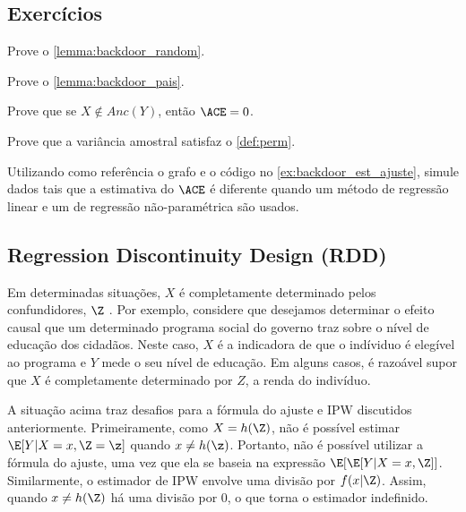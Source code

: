 \subsection{Exercícios}

\begin{exercise}
 Prove o \cref{lemma:backdoor_random}.
\end{exercise}

\begin{exercise}
 Prove o \cref{lemma:backdoor_pais}.
\end{exercise}

\begin{exercise}
 \label{ex:ace_sem_causa}
 Prove que se $X \notin Anc(Y)$, então $\ACE = 0$.
\end{exercise}

\begin{exercise}
 Prove que a variância amostral satisfaz
 o \cref{def:perm}.
\end{exercise}

\begin{exercise}
 Utilizando como referência o grafo e
 o código no \cref{ex:backdoor_est_ajuste},
 simule dados tais que a estimativa do $\ACE$ é
 diferente quando um método de regressão linear e
 um de regressão não-paramétrica são usados.
\end{exercise}

\subsection{Regression Discontinuity Design (RDD)}

Em determinadas situações,
$X$ é completamente determinado
pelos confundidores, $\Z$ \citep{Lee2010}.
Por exemplo, considere que 
desejamos determinar o efeito causal que
um determinado programa social do governo traz 
sobre o nível de educação dos cidadãos.
Neste caso, $X$ é a indicadora de que
o indíviduo é elegível ao programa e
$Y$ mede o seu nível de educação.
Em alguns casos, é razoável supor que
$X$ é completamente determinado por $Z$,
a renda do indivíduo.

A situação acima traz desafios para
a fórmula do ajuste e IPW discutidos anteriormente.
Primeiramente, como $X = h(\Z)$, 
não é possível estimar $\E[Y|X=x,\Z=\z]$
quando $x \neq h(\z)$.
Portanto, não é possível utilizar
a fórmula do ajuste, uma vez que
ela se baseia na expressão $\E[\E[Y|X=x,\Z]]$.
Similarmente, o estimador de IPW envolve
uma divisão por $f(x|\Z)$.
Assim, quando $x \neq h(\Z)$
há uma divisão por $0$, 
o que torna o estimador indefinido.

